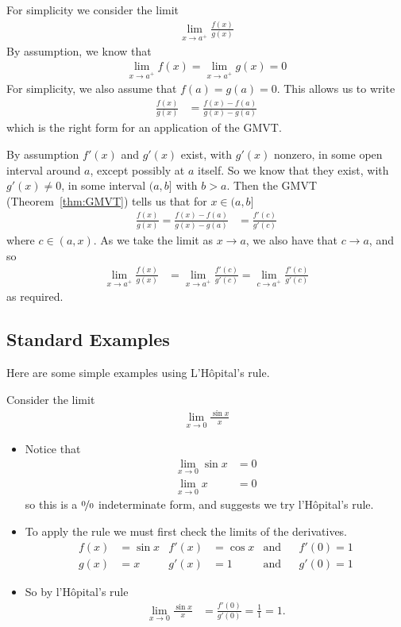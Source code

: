 For simplicity we consider the limit
\begin{align*}
  \lim_{x\to a^+} \frac{f(x)}{g(x)}
\end{align*}
By assumption, we know that
\begin{align*}
  \lim_{x\to a^+} f(x) = \lim_{x\to a^+} g(x) = 0
\end{align*}
For simplicity, we also assume that $f(a)=g(a)=0$. This
allows us to write
\begin{align*}
  \frac{f(x)}{g(x)} &= \frac{f(x)-f(a)}{g(x)-g(a)}
\end{align*}
which is the right form for an application of the GMVT.

By assumption $f'(x)$ and $g'(x)$ exist, with $g'(x)$ nonzero, in some open interval around
$a$, except possibly at $a$ itself. So we know that they exist, with $g'(x)\ne 0$, in some
interval $(a,b]$ with $b>a$.  Then the GMVT
(Theorem~\ref{thm:GMVT}) tells us that for $x\in (a,b]$
\begin{align*}
  \frac{f(x)}{g(x)} = \frac{f(x)-f(a)}{g(x)-g(a)} &= \frac{f'(c)}{g'(c)}
\end{align*}
where $c \in (a,x)$. As we take the limit as $x\to a$, we also have that $c\to a$, and so
\begin{align*}
  \lim_{x\to a^+}\frac{f(x)}{g(x)}
  &= \lim_{x\to a^+} \frac{f'(c)}{g'(c)}
  = \lim_{c \to a^+} \frac{f'(c)}{g'(c)}
\end{align*}
as required.

\subsection{Standard Examples}\label{ssec_3_7_1}
Here are some simple examples using L'H\^opital's rule.
\begin{eg}\label{eg:hopitalA}
Consider the limit
\begin{align*}
  \lim_{x\to 0} \frac{\sin x}{x}
\end{align*}
\begin{itemize}
 \item Notice that
\begin{align*}
  \lim_{x\to 0} \sin x &= 0 \\
  \lim_{x\to 0} x &= 0
\end{align*}
so this is a $\nicefrac00$ indeterminate form, and suggests we try l'H\^opital's rule.
\item To apply the rule we must first check the limits of the derivatives.
\begin{align*}
  f(x)&= \sin x & f'(x) & =\cos x & \text{and} &&
  f'(0)=1\\
  g(x) &= x & g'(x) & = 1 & \text{and} &&
  g'(0)=1
\end{align*}
\item So by l'H\^opital's rule
\begin{align*}
  \lim_{x\to 0} \frac{\sin x}{x} &= \frac{f'(0)}{g'(0)} = \frac{1}{1} = 1.
\end{align*}
\end{itemize}
\end{eg}


